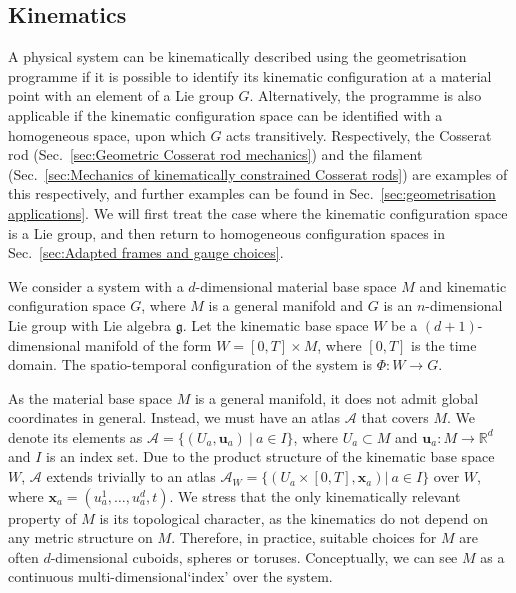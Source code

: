 
\subsection{Kinematics} \label{sec:(summary) kinematics}

A physical system can be kinematically described using the geometrisation programme if it is possible to identify its kinematic configuration at a material point with an element of a Lie group $G$. Alternatively, the programme is also applicable if the kinematic configuration space can be identified with a homogeneous space, upon which $G$ acts transitively. Respectively, the Cosserat rod (Sec.~\ref{sec:Geometric Cosserat rod mechanics}) and the filament (Sec.~\ref{sec:Mechanics of kinematically constrained Cosserat rods}) are examples of this respectively, and further examples can be found in Sec.~\ref{sec:geometrisation applications}. We will first treat the case where the kinematic configuration space is a Lie group, and then return to homogeneous configuration spaces in Sec.~\ref{sec:Adapted frames and gauge choices}.

We consider a system with a $d$-dimensional material base space $M$ and kinematic configuration space $G$, where $M$ is a general manifold and $G$ is an $n$-dimensional Lie group with Lie algebra $\mathfrak{g}$. Let the kinematic base space $W$ be a $(d+1)$-dimensional manifold of the form $W = [0, T] \times M$, where $[0, T]$ is the time domain. The spatio-temporal configuration of the system is $\Phi : W \to G$.

As the material base space $M$ is a general manifold, it does not admit global coordinates in general. Instead, we must have an atlas $\mathcal{A}$ that covers $M$. We denote its elements as $\mathcal{A} = \{ (U_a, \mathbf{u}_a)\ |\ a \in I \}$, where $U_a \subset M$ and $\mathbf{u}_a : M \to \mathbb{R}^d$ and $I$ is an index set. Due to the product structure of the kinematic base space $W$, $\mathcal{A}$ extends trivially to an atlas $\mathcal{A}_W = \{ (U_a \times [0, T], \mathbf{x}_a) |\ a \in I \}$ over $W$, where $\mathbf{x}_a = (u_a^1, \dots, u^d_a, t)$. We stress that the only kinematically relevant property of $M$ is its topological character, as the kinematics do not depend on any metric structure on $M$. Therefore, in practice, suitable choices for $M$ are often $d$-dimensional cuboids, spheres or toruses. Conceptually, we can see $M$ as a continuous multi-dimensional`index' over the system.


